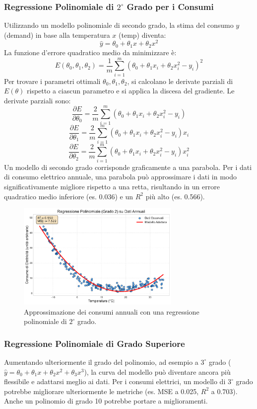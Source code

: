 \documentclass{article}
\begin{document}
\subsubsection{Regressione Polinomiale di $2^{\circ}$ Grado per i Consumi}
Utilizzando un modello polinomiale di secondo grado, la stima del consumo $y$ (demand) in base alla temperatura $x$ (temp) diventa:
$$ \hat{y} = \theta_0 + \theta_1 x + \theta_2 x^2 $$
La funzione d'errore quadratico medio da minimizzare è:
$$ E(\theta_0, \theta_1, \theta_2) = \frac{1}{m} \sum_{i=1}^{m} (\theta_0 + \theta_1 x_i + \theta_2 x_i^2 - y_i)^2 $$
Per trovare i parametri ottimali $\theta_0, \theta_1, \theta_2$, si calcolano le derivate parziali di $E(\theta)$ rispetto a ciascun parametro e si applica la discesa del gradiente. Le derivate parziali sono:
$$ \frac{\partial E}{\partial \theta_0} = \frac{2}{m} \sum_{i=1}^{m} (\theta_0 + \theta_1 x_i + \theta_2 x_i^2 - y_i) $$
$$ \frac{\partial E}{\partial \theta_1} = \frac{2}{m} \sum_{i=1}^{m} (\theta_0 + \theta_1 x_i + \theta_2 x_i^2 - y_i) x_i $$
$$ \frac{\partial E}{\partial \theta_2} = \frac{2}{m} \sum_{i=1}^{m} (\theta_0 + \theta_1 x_i + \theta_2 x_i^2 - y_i) x_i^2 $$
Un modello di secondo grado corrisponde graficamente a una parabola. Per i dati di consumo elettrico annuale, una parabola può approssimare i dati in modo significativamente migliore rispetto a una retta, risultando in un errore quadratico medio inferiore (es. 0.036) e un $R^2$ più alto (es. 0.566).

\begin{figure}[H]
    \centering
    \includegraphics[width=0.7\textwidth]{images/electricity_yearly_poly2_fit.pdf}
    \caption{Approssimazione dei consumi annuali con una regressione polinomiale di $2^{\circ}$ grado.}
    \label{fig:electricity_yearly_poly2_fit}
\end{figure}

\subsubsection{Regressione Polinomiale di Grado Superiore}
Aumentando ulteriormente il grado del polinomio, ad esempio a $3^{\circ}$ grado ($\hat{y} = \theta_0 + \theta_1 x + \theta_2 x^2 + \theta_3 x^3$), la curva del modello può diventare ancora più flessibile e adattarsi meglio ai dati. Per i consumi elettrici, un modello di $3^{\circ}$ grado potrebbe migliorare ulteriormente le metriche (es. MSE a 0.025, $R^2$ a 0.703). Anche un polinomio di grado 10 potrebbe portare a miglioramenti.
\end{document}
